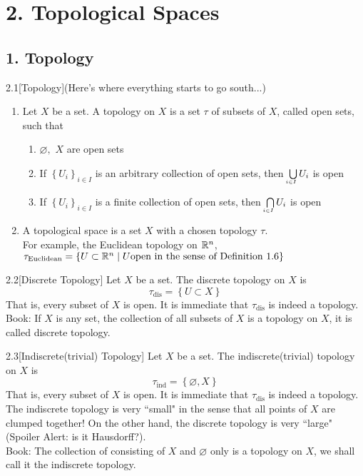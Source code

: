 \section*{2. Topological Spaces}
\subsection*{1. Topology}
\begin{customdefinition}{2.1}[Topology](Here's where everything starts to go south...)
\begin{enumerate}
    \item[1). ] Let $X$ be a set. A topology on $X$ is a set $\tau$ of subsets of $X$, called open sets, such that 
        \begin{enumerate}
            \item[i).] $\varnothing, \,\,X$ are open sets
            \item[ii).] If $\left\{U_i\right\}_{i \in I}$ is an arbitrary collection of open sets, then $\underaccent{i \in I}{\bigcup}U_i$ is open
            \item[iii).] If $\left\{U_i\right\}_{i \in I}$ is a finite collection of open sets, then $\underaccent{i \in I}{\bigcap}U_i$ is open
        \end{enumerate}
    \item[2). ]A topological space is a set $X$ with a chosen topology $\tau$.\\
            For example, the Euclidean topology on $\mathbb{R}^n$,  $\tau_{\text{Euclidean}} = \left\{U \subset \mathbb{R}^n \mid U \text{open in the sense of Definition 1.6}\right\}$
\end{enumerate}
\end{customdefinition}

\begin{customdefinition}{2.2}[Discrete Topology]
Let $X$ be a set. The discrete topology on $X$ is 
    $$\tau_{\text{dis}} = \left\{U \subset X\right\}$$
    That is, every subset of $X$ is open. It is immediate that $\tau_{\text{dis}}$ is indeed a topology.\\
Book: If $X$ is any set, the collection of all subsets of $X$ is a topology on $X$, it is called discrete topology.
\end{customdefinition}

\begin{customdefinition}{2.3}[Indiscrete(trivial) Topology]
Let $X$ be a set. The indiscrete(trivial) topology on $X$ is 
    $$\tau_{\text{ind}} = \left\{\varnothing, X\right\}$$
    That is, every subset of $X$ is open. It is immediate that $\tau_{\text{dis}}$ is indeed a topology.\\
The indiscrete topology is very ``small" in the sense that all points of $X$ are clumped together! On the other hand, the discrete topology is very ``large" (Spoiler Alert: is it Hausdorff?).\\
Book: The collection of consisting of $X$ and $\varnothing$ only is a topology on $X$, we shall call it the indiscrete topology.
\end{customdefinition}

